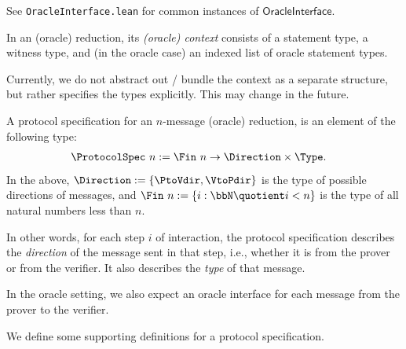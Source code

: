 See \texttt{OracleInterface.lean} for common instances of $\mathsf{OracleInterface}$.


\begin{definition}[Context]
    \label{def:context}
    In an (oracle) reduction, its \emph{(oracle) context} consists of a statement type, a witness
    type, and (in the oracle case) an indexed list of oracle statement types.

    Currently, we do not abstract out / bundle the context as a separate structure, but rather
    specifies the types explicitly. This may change in the future.
\end{definition}

\begin{definition}
    \label{def:protocol_spec}
    A protocol specification for an $n$-message (oracle) reduction, is an element of the following type:
    \begin{align*}
        \ProtocolSpec\ n &:= \Fin\ n \to \Direction \times \Type.
    \end{align*}
    In the above, $\Direction := \{ \PtoVdir, \VtoPdir \}$ is the type of possible directions of messages, and $\Fin\ n := \{ i : \bbN \quotient i < n \}$ is the type of all natural numbers less than $n$.

    In other words, for each step $i$ of interaction, the protocol specification describes the \emph{direction} of the message sent in that step, i.e., whether it is from the prover or from the verifier. It also describes the \emph{type} of that message.

    In the oracle setting, we also expect an oracle interface for each message from the prover to the verifier.
\end{definition}

We define some supporting definitions for a protocol specification.

